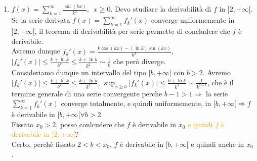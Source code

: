 \documentclass{article}
\begin{document}
\begin{enumerate}
    Se $\sum_{k=1}^{\infty} \frac{|\sin(k)|}{k}$ converge,  allora converge $\sum_{k=1}^{\infty} \frac{|\sin(k)|}{k+1}$ e, banalmente, anche $\sum_{k=1}^{\infty}|\frac{\sin(k+1)}{k+1}| \Rightarrow \sum_{k=1}^{\infty} \frac{|\cos(k)|}{k+1}$ converge, perchè $\sum_{k=1}^{\infty} \frac{\cos(k)}{k+1}$ è somma di serie assolutamente convergenti. Ma $\frac{|\cos(k)|}{k+1} \sim \frac{|\cos(k)|}{k}\Rightarrow \sum_{k=1}^{\infty}\frac{|\cos(k)|}{k}$ converge, cioè, se $\sum_{k=1}^{\infty} \frac{\sin{k}}{k}$ converge assolutamente, anche $\sum_{k=1}^{\infty} \frac{\cos(k)}{k}$ converge assolutamente, e questo è assurdo perchè $\frac{e^{ik}}{k}=\frac{\cos(k)}{k} +i \frac{\sin(k)}{k}$ e quindi $\sum_{k=1}^{\infty}\frac{e^{ik}}{k}$ convergerebbe assolutamente. Ma $\sum_{k=1}^{\infty} |\frac{e^{ik}}{k}|=\sum_{k=1}^{\infty}\frac{1}{k}$ diverge.
    \item $f(x)=\sum_{k=1}^{\infty} \frac{\sin(kx)}{k^x},\,\,\, x \geq 0$.
    Devo studiare la derivabilità di $f$ in $]2,+\infty[$. Se la serie derivata $f(x)=\sum_{k=1}^{\infty} f_k'(x)$ converge uniformemente in $]2,+\infty[$, il teorema di derivabilità per serie permette di concludere che $f$ è derivabile.\\
    Avremo dunque $ f_k'(x)=\frac{k \cos(kx)-(\ln k) \sin(kx)}{k^x}$,      $|f_k'(x)|\leq \frac{k+\ln k}{k^x} \leq \frac{k+\ln k}{k^2} \sim \frac{1}{k}$ che però diverge.\\
    Consideriamo dunque un intervallo del tipo $[b,+\infty[$ con $b >2$. Avremo $|f_k'(x)|\leq \frac{k+\ln k}{k^x} \leq \frac{k+\ln k}{k^b}$, $\sup_{ x \geq b}|f_k'(x)|\leq \frac{k +\ln k}{k^b}\sim \frac{1}{k^{b-1}}$, che è il termine generale di una serie convergente perche $b-1  > 1 \Rightarrow$ la serie $\sum_{k=1}^{\infty}f_k'(x)$ converge totalmente, e quindi uniformemente, in $[b,+\infty[ \Rightarrow f$ è derivabile in $[b,+\infty[ \forall b > 2$.\\
    Fissato $x_0 > 2$, posso conlcudere che $f$ è derivabile in $x_0$ \textcolor{orange}{e quindi $f$ è derivabile in $]2,+\infty[$}?\\
    Certo, perchè fissato $2 < b < x_0$, $f$ è derivabile in $[b,+\infty[$ e quindi anche in $x_0$.
\end{enumerate}
\end{document}
